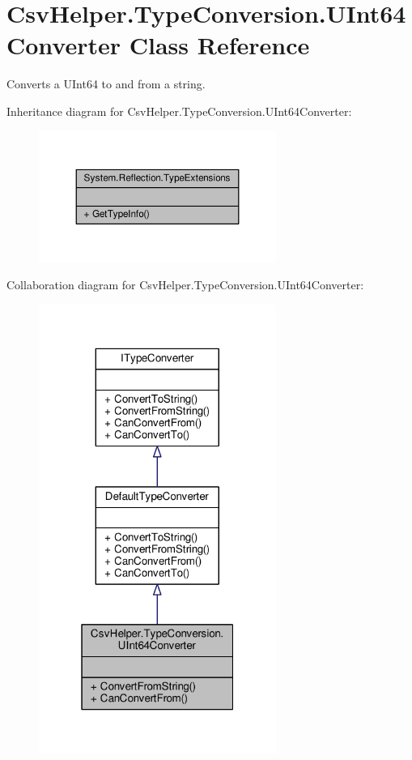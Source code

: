 \hypertarget{a00186}{\section{Csv\-Helper.\-Type\-Conversion.\-U\-Int64\-Converter Class Reference}
\label{a00186}
}


Converts a U\-Int64 to and from a string.  




Inheritance diagram for Csv\-Helper.\-Type\-Conversion.\-U\-Int64\-Converter\-:
\nopagebreak
\begin{figure}[H]
\begin{center}
\leavevmode
\includegraphics[width=220pt]{a00587}
\end{center}
\end{figure}


Collaboration diagram for Csv\-Helper.\-Type\-Conversion.\-U\-Int64\-Converter\-:
\nopagebreak
\begin{figure}[H]
\begin{center}
\leavevmode
\includegraphics[width=220pt]{a00588}
\end{center}
\end{figure}

